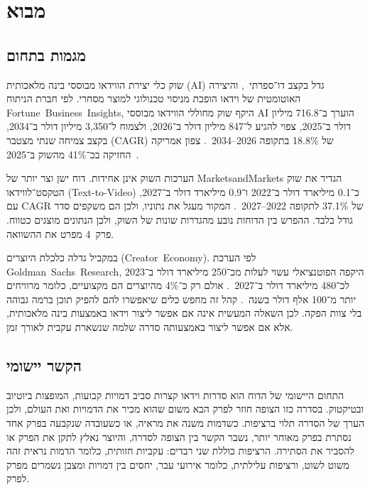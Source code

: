 \chapter{מבוא}

\section{מגמות בתחום}
שוק כלי יצירת הווידאו מבוססי בינה מלאכותית (\textenglish{AI}) גדל בקצב דו־ספרתי~\cite{fbi2026aivideo}, והיצירה האוטומטית של וידאו הופכת מניסוי טכנולוגי למוצר מסחרי. לפי חברת הניתוח \mbox{\textenglish{Fortune Business Insights}}, היקף שוק מחוללי הווידאו מבוססי \textenglish{AI} הוערך ב־716.8 מיליון דולר ב־2025, צפוי להגיע ל־847 מיליון דולר ב־2026, ולצמוח ל־3,350 מיליון דולר ב־2034, בקצב צמיחה שנתי מצטבר (\textenglish{CAGR}) של 18.8\% בתקופה \textenglish{2026–2034}~\cite{fbi2026aivideo}. צפון אמריקה החזיקה בכ־41\% מהשוק ב־2025~\cite{fbi2026aivideo}.

הערכות השוק אינן אחידות. דוח ישן וצר יותר של \textenglish{Markets\-and\-Markets} הגדיר את שוק הטקסט־לווידאו (\textenglish{Text-to-Video}) כ־0.1 מיליארד דולר ב־2022 ו־0.9 מיליארד דולר ב־2027, עם \textenglish{CAGR} של 37.1\% לתקופה \textenglish{2022–2027}~\cite{mnm2023t2v}. המקור מעגל את נתוניו, ולכן הם משקפים סדר גודל בלבד. ההפרש בין הדוחות נובע מהגדרות שונות של השוק, ולכן הנתונים מוצגים כטווח. פרק~4 מפרט את ההשוואה.

במקביל גדלה כלכלת היוצרים (\mbox{\textenglish{Creator Economy}}). לפי הערכת \mbox{\textenglish{Goldman Sachs Research}}, היקפה הפוטנציאלי עשוי לעלות מכ־250 מיליארד דולר ב־2023 לכ־480 מיליארד דולר ב־2027~\cite{goldman2023creator}. אולם רק כ־4\% מהיוצרים הם מקצועיים, כלומר מרוויחים יותר מ־100 אלף דולר בשנה~\cite{goldman2023creator}. קהל זה מחפש כלים שיאפשרו להם להפיק תוכן ברמה גבוהה בלי צוות הפקה. לכן השאלה המעשית אינה אם אפשר ליצור וידאו באמצעות בינה מלאכותית, אלא אם אפשר ליצור באמצעותה סדרה שלמה שנשארת עקבית לאורך זמן.

\section{הקשר יישומי}
התחום היישומי של הדוח הוא סדרות וידאו קצרות סביב דמויות קבועות, המופצות ביוטיוב ובטיקטוק. בסדרה כזו הצופה חוזר לפרק הבא משום שהוא מכיר את הדמויות ואת העולם, ולכן הערך של הסדרה תלוי ברציפות. כשדמות משנה את מראיה, או כשעובדה שנקבעה בפרק אחד נסתרת בפרק מאוחר יותר, נשבר הקשר בין הצופה לסדרה, והיוצר נאלץ לתקן את הפרק או להסביר את הסתירה. הרציפות כוללת שני רבדים: עקביות חזותית, כלומר הדמות נראית זהה משוט לשוט, ורציפות עלילתית, כלומר אירועי עבר, יחסים בין דמויות ומצבן נשמרים מפרק לפרק.

